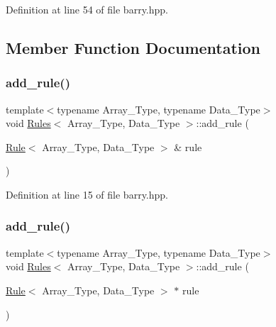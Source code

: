 Definition at line 54 of file barry.\+hpp.



\subsection{Member Function Documentation}
\mbox{\label{classbarry_1_1_rules_a60583152fddcb11178dcf3d02a924d7c}} 
\subsubsection{\texorpdfstring{add\+\_\+rule()}{add\_rule()}\hspace{0.1cm}{\footnotesize\ttfamily [1/3]}}
{\footnotesize\ttfamily template$<$typename Array\+\_\+\+Type, typename Data\+\_\+\+Type$>$ \\
void \hyperlink{classbarry_1_1_rules}{Rules}$<$ Array\+\_\+\+Type, Data\+\_\+\+Type $>$\+::add\+\_\+rule (\begin{DoxyParamCaption}\item[{\hyperlink{classbarry_1_1_rule}{Rule}$<$ Array\+\_\+\+Type, Data\+\_\+\+Type $>$ \&}]{rule }\end{DoxyParamCaption})\hspace{0.3cm}{\ttfamily [inline]}}



Definition at line 15 of file barry.\+hpp.

\mbox{\label{classbarry_1_1_rules_abd60b1d381ad0c8a772e4d81264bbe0a}} 
\subsubsection{\texorpdfstring{add\+\_\+rule()}{add\_rule()}\hspace{0.1cm}{\footnotesize\ttfamily [2/3]}}
{\footnotesize\ttfamily template$<$typename Array\+\_\+\+Type, typename Data\+\_\+\+Type$>$ \\
void \hyperlink{classbarry_1_1_rules}{Rules}$<$ Array\+\_\+\+Type, Data\+\_\+\+Type $>$\+::add\+\_\+rule (\begin{DoxyParamCaption}\item[{\hyperlink{classbarry_1_1_rule}{Rule}$<$ Array\+\_\+\+Type, Data\+\_\+\+Type $>$ $\ast$}]{rule }\end{DoxyParamCaption})\hspace{0.3cm}{\ttfamily [inline]}}



